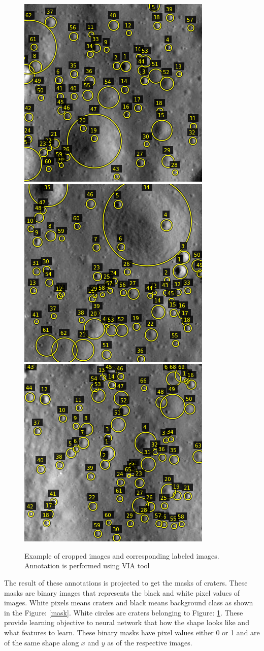 \documentclass[11pt]{article}
\begin{document}
\begin{figure}[ht!]
	\includegraphics[width=.3\textwidth]{files/annotation/66n.png}\hfill
	\includegraphics[width=.3\textwidth]{files/annotation/29n.png}\hfill
	\includegraphics[width=.3\textwidth]{files/annotation/20n.png}
	\caption{Example of cropped images and corresponding labeled images. Annotation is performed using VIA tool}
	\label{an}
\end{figure}

The result of these annotations is projected to get the masks of craters. These masks are binary images that represents the black and white pixel values of images. White pixels means craters and black means background class as shown in the Figure: \ref{mask}. White circles are craters belonging to Figure: \ref{an}. These provide learning objective to neural network that how the shape looks like and what features to learn. These binary masks have pixel values either 0 or 1 and are of the same shape along $x$ and $y$ as of the respective images.
\end{document}
